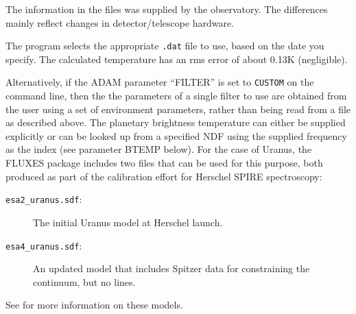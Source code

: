 \documentclass[11pt,twoside]{starlink}
\begin{document}
The information in the files was supplied by the observatory.
The differences mainly reflect changes in detector/telescope hardware.

The program selects the appropriate \texttt{.dat} file to use, based on the date
you specify.
The calculated temperature has an rms error of about 0.13K (negligible).

Alternatively, if the ADAM parameter ``FILTER'' is set to \texttt{CUSTOM}
on the command line, then the the parameters of a single filter to use
are obtained from the user using a set of environment parameters, rather
than being read from a file as described above. The planetary brightness
temperature can either be supplied explicitly or can be looked up from a
specified NDF using the supplied frequency as the index (see parameter
BTEMP below).  For the case of Uranus, the FLUXES package includes two
files that can be used for this purpose, both produced as part of the
calibration effort for Herschel SPIRE spectroscopy:
\begin{description}
\item[\texttt{esa2\_uranus.sdf}:] The initial Uranus model at Herschel launch.
\item[\texttt{esa4\_uranus.sdf}:] An updated model that includes Spitzer
data for constraining the continuum, but no lines.
\end{description}
See
for more information on these models.
\end{document}
